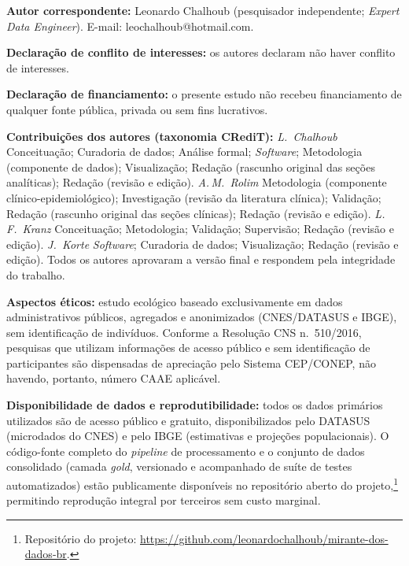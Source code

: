\documentclass[12pt,a4paper,oneside]{article}
\begin{document}
\begin{singlespace}
\vspace{0.5cm}
\noindent\textbf{Autor correspondente:} Leonardo Chalhoub
(pesquisador independente; \textit{Expert Data Engineer}).
E-mail: leochalhoub@hotmail.com.

\vspace{0.5cm}
\noindent\textbf{Declaração de conflito de interesses:} os autores
declaram não haver conflito de interesses.

\vspace{0.2cm}
\noindent\textbf{Declaração de financiamento:} o presente estudo não
recebeu financiamento de qualquer fonte pública, privada ou sem fins
lucrativos.

\vspace{0.2cm}
\noindent\textbf{Contribuições dos autores (taxonomia CRediT):}
\textit{L.\ Chalhoub} \textemdash{} Conceituação; Curadoria de dados;
Análise formal; \textit{Software}; Metodologia (componente de dados);
Visualização; Redação (rascunho original das seções analíticas);
Redação (revisão e edição). \textit{A.\,M.\ Rolim} \textemdash{}
Metodologia (componente clínico-epidemiológico); Investigação
(revisão da literatura clínica); Validação; Redação (rascunho original
das seções clínicas); Redação (revisão e edição). \textit{L.\,F.\
Kranz} \textemdash{} Conceituação; Metodologia; Validação; Supervisão;
Redação (revisão e edição). \textit{J.\ Korte} \textemdash{}
\textit{Software}; Curadoria de dados; Visualização; Redação (revisão
e edição). Todos os autores aprovaram a versão final e respondem pela
integridade do trabalho.

\vspace{0.2cm}
\noindent\textbf{Aspectos éticos:} estudo ecológico baseado
exclusivamente em dados administrativos públicos, agregados e
anonimizados (CNES/DATASUS e IBGE), sem identificação de indivíduos.
Conforme a Resolução CNS n.\ 510/2016, pesquisas que utilizam
informações de acesso público e sem identificação de participantes
são dispensadas de apreciação pelo Sistema CEP/CONEP, não havendo,
portanto, número CAAE aplicável.

\vspace{0.2cm}
\noindent\textbf{Disponibilidade de dados e reprodutibilidade:} todos
os dados primários utilizados são de acesso público e gratuito,
disponibilizados pelo DATASUS (microdados do CNES) e pelo IBGE
(estimativas e projeções populacionais). O código-fonte completo do
\textit{pipeline} de processamento e o conjunto de dados consolidado
(camada \textit{gold}, versionado e acompanhado de suíte de testes
automatizados) estão publicamente disponíveis no repositório aberto do
projeto,\footnote{Repositório do projeto:
\url{https://github.com/leonardochalhoub/mirante-dos-dados-br}.}
permitindo reprodução integral por terceiros sem custo marginal.


\end{singlespace}
\end{document}
